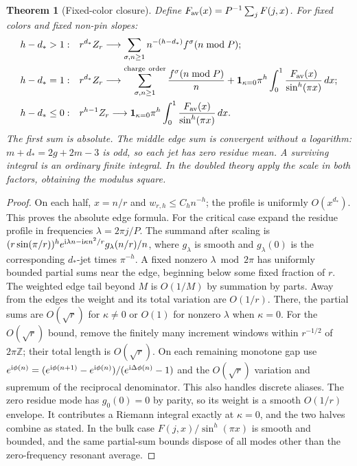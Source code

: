 \documentclass[11pt]{article}
\newtheorem{theorem}{Theorem}[section]
\newcommand\ZZ{\mathbb Z}
\newcommand\ii{{\rm i}}
\begin{document}
\begin{theorem}[Fixed-color closure]\label{thm:fixed}
Define \(F_{\rm av}(x)=P^{-1}\sum_jF(j,x)\). For fixed colors and fixed non-pin slopes:
\begin{align*}
 h-d_*>1:\quad&r^{d_*}Z_r\longrightarrow
     \sum_{\sigma,n\ge1}n^{-(h-d_*)}f^\sigma(n\bmod P);\\
 h-d_*=1:\quad&r^{d_*}Z_r\longrightarrow
     \sum_{\sigma,n\ge1}^{\rm charge\ order}\frac{f^\sigma(n\bmod P)}n
     +{\bf1}_{\kappa=0}\pi^h\int_0^1\frac{F_{\rm av}(x)}{\sin^h(\pi x)}\,dx;\\
 h-d_*\le0:\quad&r^{h-1}Z_r\longrightarrow
      {\bf1}_{\kappa=0}\pi^h\int_0^1\frac{F_{\rm av}(x)}{\sin^h(\pi x)}\,dx .
\end{align*}
The first sum is absolute. The middle edge sum is convergent without a logarithm: \(m+d_*=2g+2m-3\) is odd, so each jet has zero residue mean. A surviving integral is an ordinary finite integral. In the doubled theory apply the scale in both factors, obtaining the modulus square.
\end{theorem}

\begin{proof}
On each half, \(x=n/r\) and \(w_{r,h}\le C_h n^{-h}\); the profile is uniformly \(O(x^{d_*})\). This proves the absolute edge formula. For the critical case expand the residue profile in frequencies \(\lambda=2\pi j/P\). The summand after scaling is \((r\sin(\pi/r))^h e^{\ii\lambda n-\ii\kappa n^2/r}g_\lambda(n/r)/n\), where \(g_\lambda\) is smooth and \(g_\lambda(0)\) is the corresponding \(d_*\)-jet times \(\pi^{-h}\). A fixed nonzero \(\lambda\bmod2\pi\) has uniformly bounded partial sums near the edge, beginning below some fixed fraction of \(r\). The weighted edge tail beyond \(M\) is \(O(1/M)\) by summation by parts. Away from the edges the weight and its total variation are \(O(1/r)\). There, the partial sums are \(O(\sqrt r)\) for \(\kappa\ne0\) or \(O(1)\) for nonzero \(\lambda\) when \(\kappa=0\). For the \(O(\sqrt r)\) bound, remove the finitely many increment windows within \(r^{-1/2}\) of \(2\pi\ZZ\); their total length is \(O(\sqrt r)\). On each remaining monotone gap use
\(
 e^{\ii\phi(n)}=(e^{\ii\phi(n+1)}-e^{\ii\phi(n)})/(e^{\ii\Delta\phi(n)}-1)
\)
and the \(O(\sqrt r)\) variation and supremum of the reciprocal denominator. This also handles discrete aliases. The zero residue mode has \(g_0(0)=0\) by parity, so its weight is a smooth \(O(1/r)\) envelope. It contributes a Riemann integral exactly at \(\kappa=0\), and the two halves combine as stated. In the bulk case \(F(j,x)/\sin^h(\pi x)\) is smooth and bounded, and the same partial-sum bounds dispose of all modes other than the zero-frequency resonant average.
\end{proof}
\end{document}
